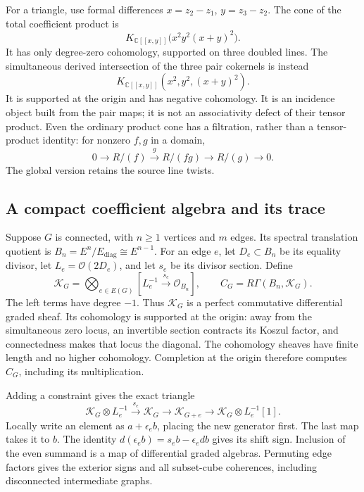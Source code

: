 For a triangle, use formal differences
\(x=z_2-z_1\), \(y=z_3-z_2\). The cone of the total
coefficient product is
\[
 K_{\mathbb C[[x,y]]}\bigl(x^2y^2(x+y)^2\bigr).
\]
It has only degree-zero cohomology, supported on three
doubled lines. The simultaneous derived intersection
of the three pair cokernels is instead
\begin{equation}\label{cyidx:eq:triangle-central}
 K_{\mathbb C[[x,y]]}(x^2,y^2,(x+y)^2).
\end{equation}
It is supported at the origin and has negative cohomology.
It is an incidence object built from the pair maps;
it is not an associativity defect of their tensor product.
Even the ordinary product cone has a filtration, rather
than a tensor-product identity: for nonzero \(f,g\)
in a domain,
\[
 0\longrightarrow R/(f)\xrightarrow{\ g\ }R/(fg)
   \longrightarrow R/(g)\longrightarrow0.
\]
The global version retains the source line twists.

\subsection{A compact coefficient algebra and its trace}

Suppose \(G\) is connected, with \(n\geq1\) vertices
and \(m\) edges. Its spectral translation quotient is
\(B_n=E^n/E_{\mathrm{diag}}\cong E^{n-1}\).
For an edge \(e\), let \(D_e\subset B_n\) be its equality
divisor, let \(L_e=\mathcal O(2D_e)\), and let \(s_e\)
be its divisor section. Define
\begin{equation}\label{cyidx:eq:global-graph}
 \mathscr K_G=\bigotimes_{e\in E(G)}
       [L_e^{-1}\xrightarrow{s_e}\mathcal O_{B_n}],
 \qquad C_G=R\Gamma(B_n,\mathscr K_G).
\end{equation}
The left terms have degree \(-1\). Thus \(\mathscr K_G\)
is a perfect commutative differential graded sheaf.
Its cohomology is supported at the origin: away from
the simultaneous zero locus, an invertible section
contracts its Koszul factor, and connectedness makes
that locus the diagonal. The cohomology sheaves have
finite length and no higher cohomology. Completion at
the origin therefore computes \(C_G\), including its
multiplication.

Adding a constraint gives the exact triangle
\begin{equation}\label{cyidx:eq:edge-triangle}
 \mathscr K_G\otimes L_e^{-1}\xrightarrow{s_e}\mathscr K_G
 \longrightarrow\mathscr K_{G+e}
 \longrightarrow\mathscr K_G\otimes L_e^{-1}[1].
\end{equation}
Locally write an element as \(a+\epsilon_e b\), placing
the new generator first. The last map takes it to \(b\).
The identity \(d(\epsilon_e b)=s_e b-\epsilon_e db\)
gives its shift sign. Inclusion of the even summand is
a map of differential graded algebras. Permuting edge
factors gives the exterior signs and all subset-cube
coherences, including disconnected intermediate graphs.

